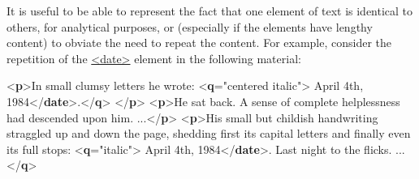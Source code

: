 It is useful to be able to represent the fact that one element of text is identical to others, for analytical purposes, or (especially if the elements have lengthy content) to obviate the need to repeat the content. For example, consider the repetition of the \hyperref[TEI.date]{<date>} element in the following material: \par\bgroup{}\exampleFont \begin{shaded}\noindent\mbox{}{<\textbf{p}>}In small clumsy letters he wrote:\mbox{}\newline 
{<\textbf{q}\hspace*{1em}{rend}="{centered italic}">}\mbox{}\newline 
\hspace*{1em}April 4th,\mbox{}\newline 
\hspace*{1em}\hspace*{1em}\hspace*{1em}\hspace*{1em} 1984{</\textbf{date}>}.{</\textbf{q}>}\mbox{}\newline 
{</\textbf{p}>}\mbox{}\newline 
{<\textbf{p}>}He sat back. A sense of complete helplessness had\mbox{}\newline 
 descended upon him. ...{</\textbf{p}>}\mbox{}\newline 
{<\textbf{p}>}His small but childish handwriting straggled up\mbox{}\newline 
 and down the page, shedding first its capital letters\mbox{}\newline 
 and finally even its full stops:\mbox{}\newline 
{<\textbf{q}\hspace*{1em}{rend}="{italic}">}\mbox{}\newline 
\hspace*{1em}April 4th, 1984{</\textbf{date}>}.\mbox{}\newline 
\hspace*{1em}\hspace*{1em} Last night to the flicks. ... {</\textbf{q}>}\mbox{}\newline 

\end{shaded}

